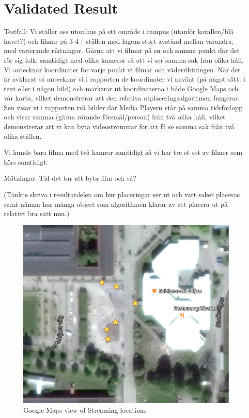 \documentclass[9pt,a4paper]{acmproc}
\begin{document}
\section{Validated Result}
Testfall:
Vi ställer oss utomhus på ett område i campus (utanför korallen/blå havet?) och filmar på 3-4+ ställen med lagom stort avstånd mellan varandra, med varierande riktningar. Gärna att vi filmar på en och samma punkt där det rör sig folk, samtidigt med olika kameror så att vi ser samma sak från olika håll. Vi antecknar koordinater för varje punkt vi filmar och väderriktningen.
När det är avklarat så antecknar vi i rapporten de koordinater vi använt (på något sätt, i text eller i någon bild) och markerar ut koordinaterna i både Google Maps och vår karta, vilket demonstrerar att den relativa utplaceringsalgoritmen fungerar. Sen visar vi i rapporten två bilder där Media Playern står på samma tidsförlopp och visar samma (gärna rörande föremål/person) från två olika håll, vilket demonstrerar att vi kan byta videoströmmar för att få se samma sak från två olika ställen.

Vi kunde bara filma med två kamror samtidigt så vi har tre st set av filmer som körs samtidigt.

Mätningar:
Tid det tar att byta film och så?

(Tänkte skriva i resultatdelen om hur placeringar ser ut och vart saker placeras samt nämna hur många object som algorithmen klarar av att placera ut på relativt bra sätt mm.)

\begin{figure}[t!]
\begin{center}
	\includegraphics[scale=0.5]{Google_Maps.png}
	\caption{Google Maps view of Streaming locations}
	\label{fig:googlemaps}
\end{center}
\end{figure}
\end{document}
